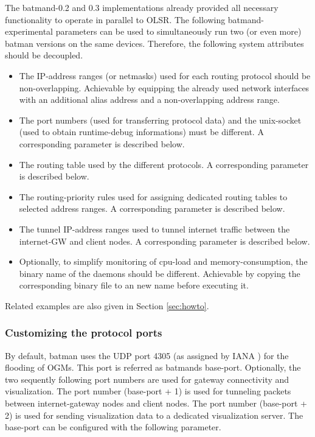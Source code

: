 \documentclass[11pt]{article}
\begin{document}
The batmand-0.2 and 0.3 implementations already provided all necessary functionality to operate in parallel to OLSR. 
%
The following batmand-experimental parameters can be used to simultaneously run two (or even more) batman versions on the same devices.
Therefore, the following system attributes should be decoupled.
\begin{itemize}

 \item The IP-address ranges (or netmasks) used for each routing protocol should be non-overlapping. Achievable by equipping the already used network interfaces with an additional alias address and a non-overlapping address range.
  
 \item The port numbers (used for transferring protocol data) and the unix-socket (used to obtain runtime-debug informations) must be different. A corresponding parameter is described below.

 \item The routing table used by the different protocols. A corresponding parameter is described below.

 \item The routing-priority rules used for assigning dedicated routing tables to selected address ranges. A corresponding parameter is described below.

 \item The tunnel IP-address ranges used to tunnel internet traffic between the internet-GW and client nodes. A corresponding parameter is described below.

 \item Optionally, to simplify monitoring of cpu-load and memory-consumption, the binary name of the daemons should be different. Achievable by copying the corresponding binary file to an new name before executing it.

\end{itemize}
%
Related examples are also given in Section \ref{sec:howto}.

\subsubsection{Customizing the protocol ports}

By default, batman uses the UDP port 4305 (as assigned by IANA \cite{iana-ports}) for the flooding of OGMs.
This port is referred as batmands base-port.
%
Optionally, the two sequently following port numbers are used for gateway connectivity and visualization.
%
The port number (base-port + 1) is used for tunneling packets between internet-gateway nodes and client nodes. 
The port number (base-port + 2) is used for sending visualization data to a dedicated visualization server.
The base-port can be configured with the following parameter.
\end{document}
